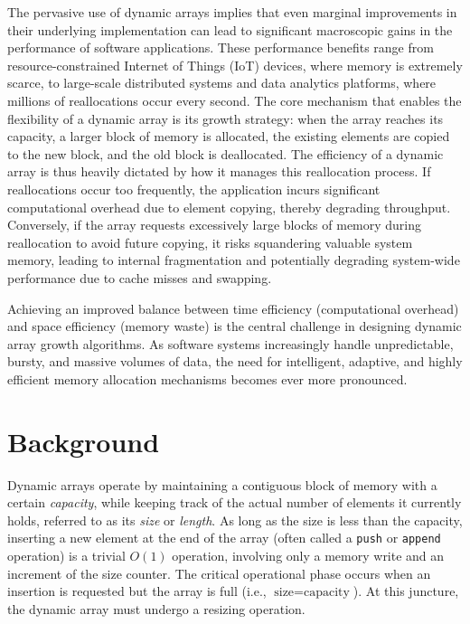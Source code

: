 The pervasive use of dynamic arrays implies that even marginal improvements in 
their underlying implementation can lead to significant macroscopic gains in the 
performance of software applications. These performance benefits range from 
resource-constrained Internet of Things (IoT) devices, where memory is extremely 
scarce, to large-scale distributed systems and data analytics platforms, where 
millions of reallocations occur every second. The core mechanism that enables 
the flexibility of a dynamic array is its growth strategy: when the array reaches 
its capacity, a larger block of memory is allocated, the existing elements are 
copied to the new block, and the old block is deallocated. The efficiency of 
a dynamic array is thus heavily dictated by how it manages this reallocation 
process. If reallocations occur too frequently, the application incurs significant 
computational overhead due to element copying, thereby degrading throughput. 
Conversely, if the array requests excessively large blocks of memory during 
reallocation to avoid future copying, it risks squandering valuable system 
memory, leading to internal fragmentation and potentially degrading system-wide 
performance due to cache misses and swapping.

Achieving an improved balance between time efficiency (computational overhead) 
and space efficiency (memory waste) is the central challenge in designing 
dynamic array growth algorithms. As software systems increasingly handle 
unpredictable, bursty, and massive volumes of data, the need for intelligent, 
adaptive, and highly efficient memory allocation mechanisms becomes ever more 
pronounced.

\section{Background}
Dynamic arrays operate by maintaining a contiguous block of memory with a 
certain \textit{capacity}, while keeping track of the actual number of elements 
it currently holds, referred to as its \textit{size} or \textit{length}. As long 
as the size is less than the capacity, inserting a new element at the end of 
the array (often called a \texttt{push} or \texttt{append} operation) is a 
trivial $O(1)$ operation, involving only a memory write and an increment of 
the size counter. The critical operational phase occurs when an insertion is 
requested but the array is full (i.e., $\text{size} = \text{capacity}$). At 
this juncture, the dynamic array must undergo a resizing operation.


